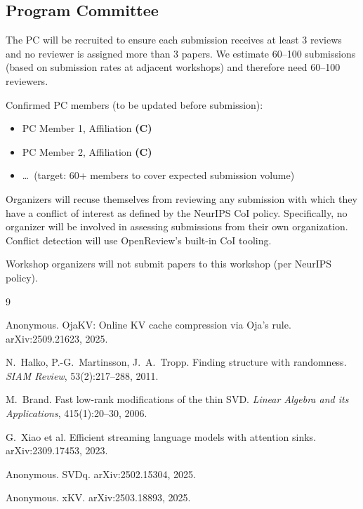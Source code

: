 \documentclass{article}
\begin{document}

\subsection*{Program Committee}

The PC will be recruited to ensure each submission receives at least 3 reviews and
no reviewer is assigned more than 3 papers.  We estimate 60--100 submissions
(based on submission rates at adjacent workshops) and therefore need 60--100
reviewers.

Confirmed PC members (to be updated before submission):
\begin{itemize}[nosep,leftmargin=1.5em]
  \item PC Member 1, Affiliation \textbf{(C)}
  \item PC Member 2, Affiliation \textbf{(C)}
  \item \ldots\ (target: 60+ members to cover expected submission volume)
\end{itemize}

Organizers will recuse themselves from reviewing any submission with which they
have a conflict of interest as defined by the NeurIPS CoI policy.
Specifically, no organizer will be involved in assessing submissions from their
own organization.  Conflict detection will use OpenReview's built-in CoI tooling.

Workshop organizers will not submit papers to this workshop (per NeurIPS policy).


\begin{thebibliography}{9}

Anonymous.
OjaKV: Online KV cache compression via Oja's rule.
arXiv:2509.21623, 2025.

N.~Halko, P.-G.~Martinsson, J.~A.~Tropp.
Finding structure with randomness.
\emph{SIAM Review}, 53(2):217--288, 2011.

M.~Brand.
Fast low-rank modifications of the thin SVD.
\emph{Linear Algebra and its Applications}, 415(1):20--30, 2006.

G.~Xiao et al.
Efficient streaming language models with attention sinks.
arXiv:2309.17453, 2023.

Anonymous. SVDq. arXiv:2502.15304, 2025.

Anonymous. xKV. arXiv:2503.18893, 2025.

\end{thebibliography}
\end{document}
